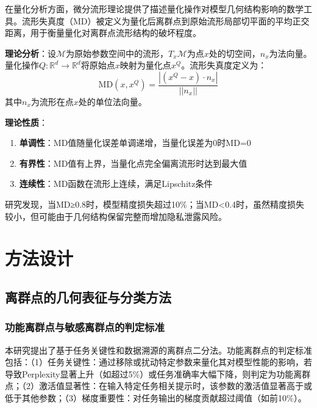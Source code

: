在量化分析方面，微分流形理论提供了描述量化操作对模型几何结构影响的数学工具。流形失真度（MD）被定义为量化后离群点到原始流形局部切平面的平均正交距离，用于衡量量化对离群点流形结构的破坏程度。

\textbf{理论分析}：设$\mathcal{M}$为原始参数空间中的流形，$T_x\mathcal{M}$为点$x$处的切空间，$n_x$为法向量。量化操作$Q: \mathbb{R}^d \rightarrow \mathbb{R}^d$将原始点$x$映射为量化点$x^Q$。流形失真度定义为：
\begin{equation}
\text{MD}(x, x^Q) = \frac{|(x^Q - x) \cdot n_x|}{||n_x||}
\end{equation}
其中$n_x$为流形在点$x$处的单位法向量。

\textbf{理论性质}：
\begin{enumerate}
\item \textbf{单调性}：MD值随量化误差单调递增，当量化误差为0时MD=0
\item \textbf{有界性}：MD值有上界，当量化点完全偏离流形时达到最大值
\item \textbf{连续性}：MD函数在流形上连续，满足Lipschitz条件
\end{enumerate}

研究发现，当MD≥0.8时，模型精度损失超过10\%；当MD<0.4时，虽然精度损失较小，但可能由于几何结构保留完整而增加隐私泄露风险。

\section{方法设计}

\subsection{离群点的几何表征与分类方法}

\subsubsection{功能离群点与敏感离群点的判定标准}

本研究提出了基于任务关键性和数据溯源的离群点二分法。功能离群点的判定标准包括：（1）任务关键性：通过移除或扰动特定参数来量化其对模型性能的影响，若导致Perplexity显著上升（如超过5\%）或任务准确率大幅下降，则判定为功能离群点；（2）激活值显著性：在输入特定任务相关提示时，该参数的激活值显著高于或低于其他参数；（3）梯度重要性：对任务输出的梯度贡献超过阈值（如前10\%）。

